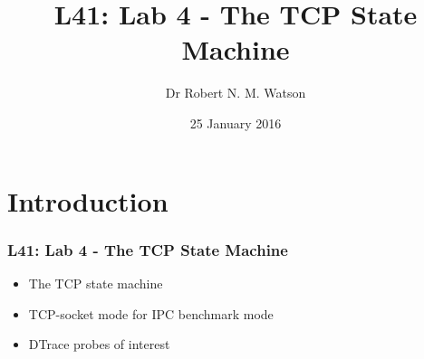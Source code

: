 
{
}

\usepackage[english]{babel}
\usepackage[latin1]{inputenc}
\usepackage{graphicx}
\usepackage{times}
\usepackage[T1]{fontenc}
\usepackage{fancyvrb}
\usepackage{hyperref}
\usepackage{listings}


\def\Tiny{\fontsize{4pt}{4pt} \selectfont}

\title{L41: Lab 4 - The TCP State Machine}
\author{Dr Robert N. M. Watson}
\date{25 January 2016}

\begin{frame}
  \titlepage
\end{frame}

\section{Introduction}

\begin{frame}
  \frametitle{L41: Lab 4 - The TCP State Machine}

  \begin{itemize}
    \item The TCP state machine
    \item TCP-socket mode for IPC benchmark mode
    \item DTrace probes of interest
  \end{itemize}
\end{frame}

